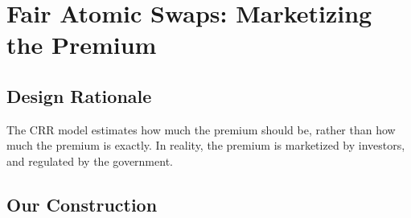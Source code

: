 \section{Fair Atomic Swaps: Marketizing the Premium}
\label{sec:fairer_atomic_swap}

\subsection{Design Rationale}

The CRR model estimates how much the premium should be, rather than how much the premium is exactly.
In reality, the premium is marketized by investors, and regulated by the government.

\subsection{Our Construction}